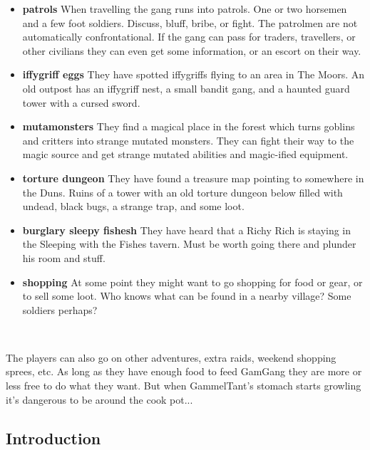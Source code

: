 \begin{itemize}

    \item \textbf{patrols} When travelling the gang runs into patrols. One or two horsemen and a few foot soldiers. Discuss, bluff, bribe, or fight. The patrolmen are not automatically confrontational. If the gang can pass for traders, travellers, or other civilians they can even get some information, or an escort on their way.

    \item \textbf{iffygriff eggs} They have spotted iffygriffs flying to an area in The Moors. An old outpost has an iffygriff nest, a small bandit gang, and a haunted guard tower with a cursed sword.

    \item \textbf{mutamonsters} They find a magical place in the forest which turns goblins and critters into strange mutated monsters. They can fight their way to the magic source and get strange mutated abilities and magic-ified equipment.

    \item \textbf{torture dungeon} They have found a treasure map pointing to somewhere in the Duns. Ruins of a tower with an old torture dungeon below filled with undead, black bugs, a strange trap, and some loot.

    \item \textbf{burglary sleepy fishesh} They have heard that a Richy Rich is staying in the Sleeping with the Fishes tavern. Must be worth going there and plunder his room and stuff.

    \item \textbf{shopping} At some point they might want to go shopping for food or gear, or to sell some loot. Who knows what can be found in a nearby village? Some soldiers perhaps?

\end{itemize}

\

The players can also go on other adventures, extra raids, weekend shopping sprees, etc. As long as they have enough food to feed GamGang they are more or less free to do what they want. But when GammelTant's stomach starts growling it's dangerous to be around the cook pot...


\subsection*{Introduction}

